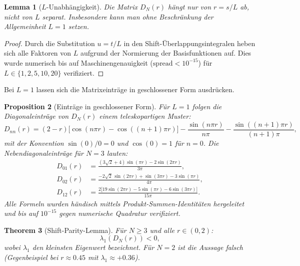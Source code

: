 \documentclass[12pt,a4paper]{article}
\newtheorem{theorem}{Theorem}[section]
\newtheorem{lemma}[theorem]{Lemma}
\newtheorem{proposition}[theorem]{Proposition}
\theoremstyle{definition}
\theoremstyle{remark}
\begin{document}
\begin{lemma}[$L$-Unabhängigkeit]
\label{lem:L-indep}
Die Matrix $D_N(r)$ hängt nur von $r = s/L$ ab, nicht von $L$ separat. Insbesondere kann man ohne Beschränkung der Allgemeinheit $L = 1$ setzen.
\end{lemma}

\begin{proof}
Durch die Substitution $u = t/L$ in den Shift-Überlappungsintegralen heben sich alle Faktoren von $L$ aufgrund der Normierung der Basisfunktionen auf. Dies wurde numerisch bis auf Maschinengenauigkeit ($\text{spread} < 10^{-15}$) für $L \in \{1, 2, 5, 10, 20\}$ verifiziert.
\end{proof}

Bei $L=1$ lassen sich die Matrixeinträge in geschlossener Form ausdrücken.

\begin{proposition}[Einträge in geschlossener Form]
\label{prop:closed-form}
Für $L = 1$ folgen die Diagonaleinträge von $D_N(r)$ einem teleskopartigen Muster:
\[
  D_{nn}(r) = (2-r)\bigl[\cos(n\pi r) - \cos((n{+}1)\pi r)\bigr]
  - \frac{\sin(n\pi r)}{n\pi} - \frac{\sin((n{+}1)\pi r)}{(n{+}1)\pi},
\]
mit der Konvention $\sin(0)/0 = 0$ und $\cos(0) = 1$ für $n = 0$. Die Nebendiagonaleinträge für $N = 3$ lauten:
\begin{align*}
  D_{01}(r) &= \frac{(3\sqrt{2}+4)\sin(\pi r) - 2\sin(2\pi r)}{3\pi}, \\
  D_{02}(r) &= \frac{-2\sqrt{2}\,\sin(2\pi r) + \sin(3\pi r) - 3\sin(\pi r)}{4\pi}, \\
  D_{12}(r) &= \frac{2\bigl[19\sin(2\pi r) - 5\sin(\pi r) - 6\sin(3\pi r)\bigr]}{15\pi}.
\end{align*}
Alle Formeln wurden händisch mittels Produkt-Summen-Identitäten hergeleitet und bis auf $10^{-15}$ gegen numerische Quadratur verifiziert.
\end{proposition}

\begin{theorem}[Shift-Parity-Lemma]
\label{thm:shift-parity}
Für $N \geq 3$ und alle $r \in (0, 2)$:
\[
  \lambda_1(D_N(r)) < 0,
\]
wobei $\lambda_1$ den kleinsten Eigenwert bezeichnet. Für $N = 2$ ist die Aussage falsch (Gegenbeispiel bei $r \approx 0.45$ mit $\lambda_1 \approx +0.36$).
\end{theorem}
\end{document}

